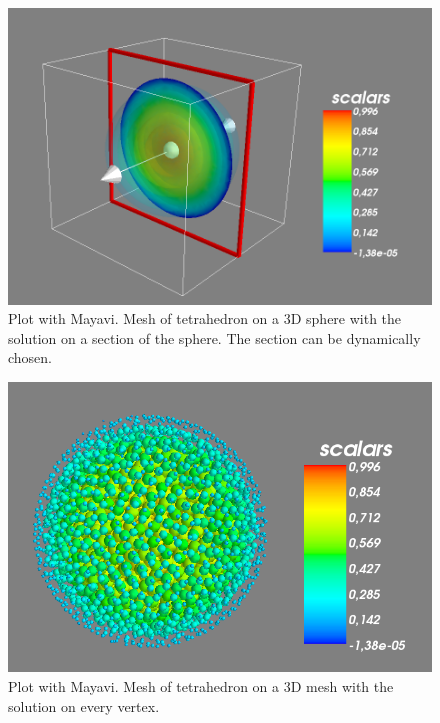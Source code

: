\begin{figure}[!h]
\label{img:matplotlibMesh}
\centering
\includegraphics[scale=0.35]{images/mayavi3D.png}
\caption{Plot with Mayavi. Mesh of tetrahedron on a $3$D sphere with the solution on a section of the sphere. The section can be dynamically chosen.}
\end{figure}

\begin{figure}[!h]
\label{img:matplotlibMesh}
\centering
\includegraphics[scale=0.4]{images/mayavi3DPoints.png}
\caption{Plot with Mayavi. Mesh of tetrahedron on a $3$D mesh with the solution on every vertex.}
\end{figure}
